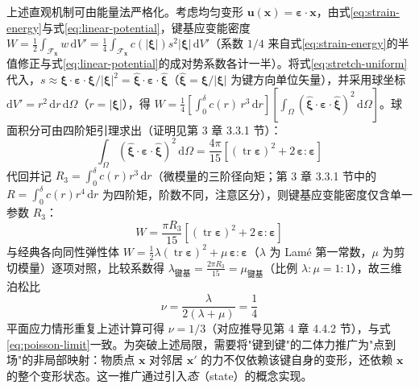 上述直观机制可由能量法严格化。考虑均匀变形 $\mathbf{u}(\mathbf{x})=\boldsymbol{\varepsilon}\cdot\mathbf{x}$，由式\eqref{eq:strain-energy}与式\eqref{eq:linear-potential}，键基应变能密度 $W=\frac{1}{2}\int_{\mathcal{F}_{\mathbf{x}}}w\,\mathrm{d}V'=\frac{1}{4}\int_{\mathcal{F}_{\mathbf{x}}}c(|\boldsymbol{\xi}|)s^{2}|\boldsymbol{\xi}|\,\mathrm{d}V'$（系数 $1/4$ 来自式\eqref{eq:strain-energy}的半值修正与式\eqref{eq:linear-potential}的成对势系数各计一半）。将式\eqref{eq:stretch-uniform}代入，$s\approx\boldsymbol{\xi}\cdot\boldsymbol{\varepsilon}\cdot\boldsymbol{\xi}/|\boldsymbol{\xi}|^{2}=\hat{\boldsymbol{\xi}}\cdot\boldsymbol{\varepsilon}\cdot\hat{\boldsymbol{\xi}}$（$\hat{\boldsymbol{\xi}}=\boldsymbol{\xi}/|\boldsymbol{\xi}|$ 为键方向单位矢量），并采用球坐标 $\mathrm{d}V'=r^{2}\,\mathrm{d}r\,\mathrm{d}\Omega$（$r=|\boldsymbol{\xi}|$），得 $W=\frac{1}{4}\left[\int_{0}^{\delta}c(r)\,r^{3}\,\mathrm{d}r\right]\left[\int_{\Omega}(\hat{\boldsymbol{\xi}}\cdot\boldsymbol{\varepsilon}\cdot\hat{\boldsymbol{\xi}})^{2}\,\mathrm{d}\Omega\right]$。球面积分可由四阶矩引理求出（证明见第 3 章 3.3.1 节）：
\begin{equation}
  \int_{\Omega}(\hat{\boldsymbol{\xi}}\cdot\boldsymbol{\varepsilon}\cdot\hat{\boldsymbol{\xi}})^{2}\,\mathrm{d}\Omega = \frac{4\pi}{15}\left[(\operatorname{tr}\boldsymbol{\varepsilon})^{2}+2\,\boldsymbol{\varepsilon}:\boldsymbol{\varepsilon}\right]
  \label{eq:sphere-quartic}
\end{equation}
代回并记 $R_{3}=\int_{0}^{\delta}c(r)r^{3}\,\mathrm{d}r$（微模量的三阶径向矩；第 3 章 3.3.1 节中的 $R=\int_{0}^{\delta}c(r)r^{4}\,\mathrm{d}r$ 为四阶矩，阶数不同，注意区分），则键基应变能密度仅含单一参数 $R_{3}$：
\begin{equation}
  W = \frac{\pi R_{3}}{15}\left[(\operatorname{tr}\boldsymbol{\varepsilon})^{2}+2\,\boldsymbol{\varepsilon}:\boldsymbol{\varepsilon}\right]
  \label{eq:pd-lame-energy}
\end{equation}
与经典各向同性弹性体 $W=\frac{1}{2}\lambda(\operatorname{tr}\boldsymbol{\varepsilon})^{2}+\mu\,\boldsymbol{\varepsilon}:\boldsymbol{\varepsilon}$（$\lambda$ 为 Lam\'e 第一常数，$\mu$ 为剪切模量）逐项对照，比较系数得 $\lambda_{\text{键基}}=\frac{2\pi R_{3}}{15}=\mu_{\text{键基}}$（比例 $\lambda:\mu=1:1$），故三维泊松比
\begin{equation}
  \nu = \frac{\lambda}{2(\lambda+\mu)} = \frac{1}{4}
  \label{eq:nu-energy}
\end{equation}
平面应力情形重复上述计算可得 $\nu=1/3$（对应推导见第 4 章 4.4.2 节），与式\eqref{eq:poisson-limit}一致。为突破上述局限，需要将"键到键"的二体力推广为"点到场"的非局部映射：物质点 $\mathbf{x}$ 对邻居 $\mathbf{x}'$ 的力不仅依赖该键自身的变形，还依赖 $\mathbf{x}$ 的整个变形状态。这一推广通过引入\emph{态}（state）的概念实现。


